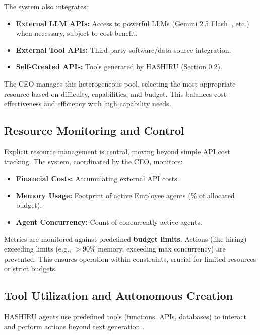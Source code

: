 \documentclass[conference]{IEEEtran}
\begin{document}
The system also integrates:
\begin{itemize}
    \item \textbf{External LLM APIs:} Access to powerful LLMs (Gemini 2.5 Flash~\cite{gemini25flash}, etc.) when necessary, subject to cost-benefit.
    \item \textbf{External Tool APIs:} Third-party software/data source integration.
    \item \textbf{Self-Created APIs:} Tools generated by HASHIRU (Section \ref{subsec:tooling}).
\end{itemize}
The CEO manages this heterogeneous pool, selecting the most appropriate resource based on difficulty, capabilities, and budget. This balances cost-effectiveness and efficiency with high capability needs.

\subsection{Resource Monitoring and Control}
\label{subsec:resource_mgmt}
Explicit resource management is central, moving beyond simple API cost tracking. The system, coordinated by the CEO, monitors:
\begin{itemize}
    \item \textbf{Financial Costs:} Accumulating external API costs.
    \item \textbf{Memory Usage:} Footprint of active Employee agents (\% of allocated budget).
    \item \textbf{Agent Concurrency:} Count of concurrently active agents.
\end{itemize}
Metrics are monitored against predefined \textbf{budget limits}. Actions (like hiring) exceeding limits (e.g., $>$90\% memory, exceeding max concurrency) are prevented. This ensures operation within constraints, crucial for limited resources or strict budgets.

\subsection{Tool Utilization and Autonomous Creation}
\label{subsec:tooling}
HASHIRU agents use predefined tools (functions, APIs, databases) to interact and perform actions beyond text generation \cite{yao2022react, openai_func_calling}.
\end{document}
